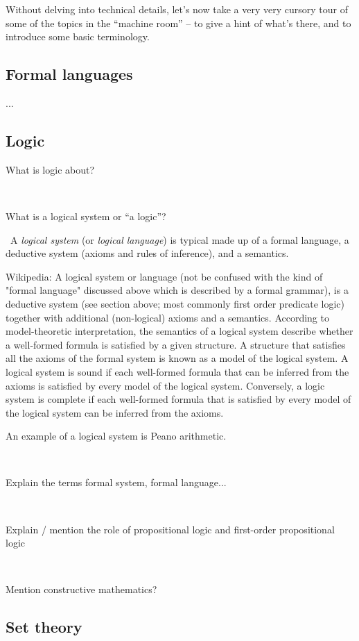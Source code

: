 Without delving into technical details, let's now take a very very cursory tour of some of the topics in the ``machine room'' -- to give a hint of what's there, and to introduce some basic terminology.  


\subsection{Formal languages}

...

\subsection{Logic}

What is logic about?

\

What is a logical system or ``a logic''? 

\
A \emph{logical system} (or \emph{logical language}) is typical made up of a formal language, a deductive system (axioms and rules of inference), and a semantics. 


Wikipedia: A logical system or language (not be confused with the kind of "formal language" discussed above which is described by a formal grammar), is a deductive system (see section above; most commonly first order predicate logic) together with additional (non-logical) axioms and a semantics. According to model-theoretic interpretation, the semantics of a logical system describe whether a well-formed formula is satisfied by a given structure. A structure that satisfies all the axioms of the formal system is known as a model of the logical system. A logical system is sound if each well-formed formula that can be inferred from the axioms is satisfied by every model of the logical system. Conversely, a logic system is complete if each well-formed formula that is satisfied by every model of the logical system can be inferred from the axioms.

An example of a logical system is Peano arithmetic. 


\

Explain the terms formal system, formal language... 

\

Explain / mention the role of propositional logic and first-order propositional logic


\

Mention constructive mathematics? 

\subsection{Set theory}

